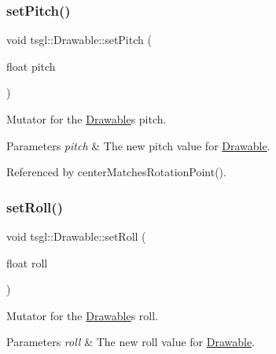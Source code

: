 \mbox{\label{classtsgl_1_1_drawable_a7857e9c90950854f76bf5967d0957367}} 
\subsubsection{\texorpdfstring{set\+Pitch()}{setPitch()}}
{\footnotesize\ttfamily void tsgl\+::\+Drawable\+::set\+Pitch (\begin{DoxyParamCaption}\item[{float}]{pitch }\end{DoxyParamCaption})\hspace{0.3cm}{\ttfamily [virtual]}}



Mutator for the \hyperlink{classtsgl_1_1_drawable}{Drawable}\textquotesingle{}s pitch. 


\begin{DoxyParams}{Parameters}
{\em pitch} & The new pitch value for \hyperlink{classtsgl_1_1_drawable}{Drawable}. \\
\hline
\end{DoxyParams}


Referenced by center\+Matches\+Rotation\+Point().

\mbox{\label{classtsgl_1_1_drawable_a7a99b21ab628ab11cdf5289ece1adf50}} 
\subsubsection{\texorpdfstring{set\+Roll()}{setRoll()}}
{\footnotesize\ttfamily void tsgl\+::\+Drawable\+::set\+Roll (\begin{DoxyParamCaption}\item[{float}]{roll }\end{DoxyParamCaption})\hspace{0.3cm}{\ttfamily [virtual]}}



Mutator for the \hyperlink{classtsgl_1_1_drawable}{Drawable}\textquotesingle{}s roll. 


\begin{DoxyParams}{Parameters}
{\em roll} & The new roll value for \hyperlink{classtsgl_1_1_drawable}{Drawable}. \\
\hline
\end{DoxyParams}


